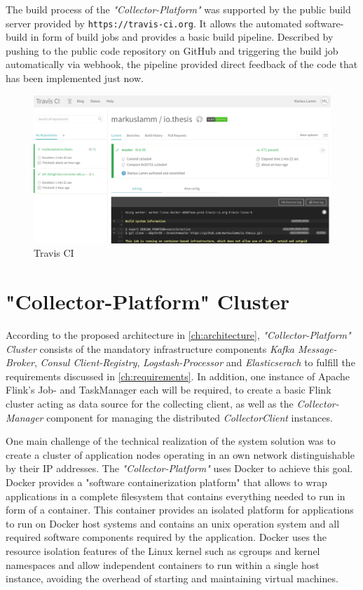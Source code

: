 The build process of the \textit{"Collector-Platform"} was supported by the public build server provided by \verb|https://travis-ci.org|.
It allows the automated software-build in form of build jobs and provides a basic build pipeline. Described by pushing to the public code
repository on GitHub and triggering the build job automatically via webhook, the pipeline provided direct feedback of the code that has been
implemented just now.
\begin{figure}[H]
	\centering
	\includegraphics[width=1.0\textwidth]{../images/07-travis.png}
	\caption{Travis CI}
	\label{fig:travis}
\end{figure}

\section{"Collector-Platform" Cluster}
\label{sec:collector-platform-cluster}

According to the proposed architecture in \autoref{ch:architecture}, \textit{"Collector-Platform" Cluster} consists of the
mandatory infrastructure components \textit{Kafka Message-Broker}, \textit{Consul Client-Registry}, \textit{Logstash-Processor} and
\textit{Elasticserach} to fulfill the requirements discussed in \autoref{ch:requirements}. In addition, one instance of
Apache Flink's Job- and TaskManager each will be required, to create a basic Flink cluster acting as data source for the collecting client,
as well as the \textit{Collector-Manager} component for managing the distributed \textit{CollectorClient} instances.

One main challenge of the technical realization of the system solution was to create a cluster of application nodes operating in an
own network distinguishable by their IP addresses. The \textit{"Collector-Platform"} uses Docker to achieve this goal.
Docker provides a "software containerization platform" that allows to wrap applications in a complete filesystem that contains everything
needed to run in form of a container. This container provides an isolated platform for applications to run on Docker host systems
and contains an unix operation system and all required software components required by the application.
Docker uses the resource isolation features of the Linux kernel such as cgroups and kernel namespaces and allow independent containers
to run within a single host instance, avoiding the overhead of starting and maintaining virtual machines.

